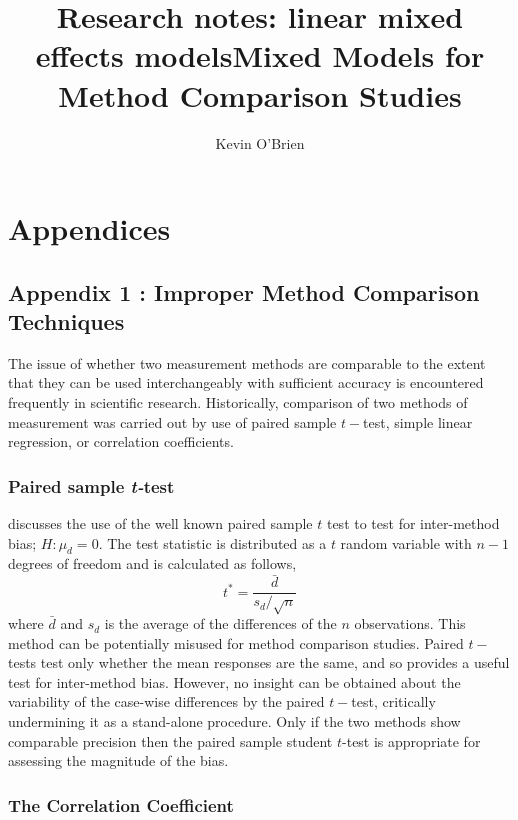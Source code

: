 \documentclass[12pt, a4paper]{report}
\title{Research notes: linear mixed effects models}
\author{ } \date{ }
\theoremstyle{plain}
\theoremstyle{definition}
\theoremstyle{remark}
\begin{document}
	\author{Kevin O'Brien}
	\title{Mixed Models for Method Comparison Studies}
	\tableofcontents
	
\chapter{Appendices}
\section{Appendix 1 : Improper Method Comparison Techniques}
	The issue of whether two measurement methods are comparable to the extent that they can be used interchangeably with sufficient accuracy is encountered frequently in scientific research. Historically, comparison of two methods of measurement was carried
	out by use of paired sample $t-$test, 
	simple linear regression, or correlation coefficients. 
	
	
	\subsection*{Paired sample \emph{t-}test}
	\citet{Bartko} discusses the use of the well known paired sample $t$ test to test for inter-method bias; $H: \mu_{d}=0$. The test
	statistic is distributed as a $t$ random variable with $n-1$ degrees of freedom and is calculated as follows,
	\begin{equation}
	t^{*} = \frac{\bar{d}}{ s_d/\sqrt{n}}
	\end{equation}
	where $\bar{d}$ and $s_{d}$ is the average of the differences of the $n$ observations. This method can be potentially misused for method comparison studies. Paired $t-$tests test only whether the mean responses are the same, and so provides a useful test for inter-method bias. However, no insight can be obtained about the variability of the case-wise differences by the paired $t-$test, critically undermining it as a stand-alone procedure. Only if the two methods show comparable
	precision then the paired sample student $t$-test is appropriate for assessing the magnitude of the bias.
	
	
	
	\subsection*{The Correlation Coefficient}
	
\end{document}
